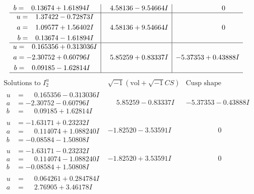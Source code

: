 \documentclass[1p]{elsarticle_modified}
\theoremstyle{definition}
\newcommand{\I}{\sqrt{-1}}
\begin{document}
$$\begin{array}{c|c|c}
\begin{aligned}
b &= \phantom{-}0.13674 + 1.61894 I\end{aligned}
 & \phantom{-}4.58136 - 9.54664 I & \phantom{-0.000000 } 0 \\ \hline\begin{aligned}
u &= \phantom{-}1.37422 - 0.72873 I \\
a &= \phantom{-}1.09577 + 1.56402 I \\
b &= \phantom{-}0.13674 - 1.61894 I\end{aligned}
 & \phantom{-}4.58136 + 9.54664 I & \phantom{-0.000000 } 0 \\ \hline\begin{aligned}
u &= \phantom{-}0.165356 + 0.313036 I \\
a &= -2.30752 + 0.60796 I \\
b &= \phantom{-}0.09185 - 1.62814 I\end{aligned}
 & \phantom{-}5.85259 + 0.83337 I & -5.37353 + 0.43888 I\\
 \hline 
 \end{array}$$\newpage$$\begin{array}{c|c|c}  
\text{Solutions to }I^u_{2}& \I (\text{vol} + \sqrt{-1}CS) & \text{Cusp shape}\\
 \hline 
\begin{aligned}
u &= \phantom{-}0.165356 - 0.313036 I \\
a &= -2.30752 - 0.60796 I \\
b &= \phantom{-}0.09185 + 1.62814 I\end{aligned}
 & \phantom{-}5.85259 - 0.83337 I & -5.37353 - 0.43888 I \\ \hline\begin{aligned}
u &= -1.63171 + 0.23232 I \\
a &= \phantom{-}0.114074 + 1.088240 I \\
b &= -0.08584 - 1.50808 I\end{aligned}
 & -1.82520 - 3.53591 I & \phantom{-0.000000 } 0 \\ \hline\begin{aligned}
u &= -1.63171 - 0.23232 I \\
a &= \phantom{-}0.114074 - 1.088240 I \\
b &= -0.08584 + 1.50808 I\end{aligned}
 & -1.82520 + 3.53591 I & \phantom{-0.000000 } 0 \\ \hline\begin{aligned}
u &= \phantom{-}0.064261 + 0.284784 I \\
a &= \phantom{-}2.76905 + 3.46178 I \\

\end{aligned}
\end{array}$$
\end{document}
